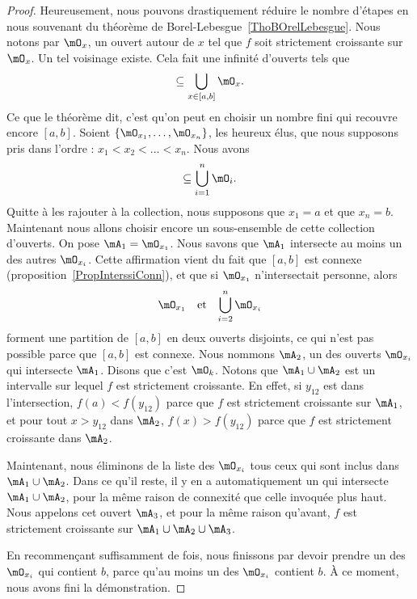 \begin{proof}
    Heureusement, nous pouvons drastiquement réduire le nombre d'étapes en nous souvenant du théorème de Borel-Lebesgue~\ref{ThoBOrelLebesgue}. Nous notons par $\mO_x$, un ouvert autour de $x$ tel que $f$ soit strictement croissante sur $\mO_x$. Un tel voisinage existe. Cela fait une infinité d'ouverts tels que
    \begin{equation}
        [a,b]\subseteq\bigcup_{x\in[a,b]}\mO_x.
    \end{equation}
    Ce que le théorème dit, c'est qu'on peut en choisir un nombre fini qui recouvre encore $[a,b]$. Soient $\{ \mO_{x_1},\ldots,\mO_{x_n} \}$, les heureux élus, que nous supposons pris dans l'ordre : $x_1<x_2<\ldots<x_n$. Nous avons
    \begin{equation}
        [a,b]\subseteq\bigcup_{i=1}^n\mO_i.
    \end{equation}
    Quitte à les rajouter à la collection, nous supposons que $x_1=a$ et que $x_n=b$. Maintenant nous allons choisir encore un sous-ensemble de cette collection d'ouverts. On pose $\mA_1=\mO_{x_1}$. Nous savons que $\mA_1$ intersecte au moins un des autres $\mO_{x_i}$. Cette affirmation vient du fait que $[a,b]$ est connexe (proposition~\ref{PropInterssiConn}), et que si $\mO_{x_1}$ n'intersectait personne, alors
    \begin{equation}
        \begin{aligned}[]
            \mO_{x_1}&&\text{et}&&\bigcup_{i=2}^n\mO_{x_i}
        \end{aligned}
    \end{equation}
    forment une partition de $[a,b]$ en deux ouverts disjoints, ce qui n'est pas possible parce que $[a,b]$ est connexe. Nous nommons $\mA_2$, un des ouverts $\mO_{x_i}$ qui intersecte $\mA_1$. Disons que c'est $\mO_k$. Notons que $\mA_1\cup\mA_2$ est un intervalle sur lequel $f$ est strictement croissante. En effet, si $y_{12}$ est dans l'intersection, $f(a)<f(y_{12})$ parce que $f$ est strictement croissante sur $\mA_1$, et pour tout $x>y_{12}$ dans $\mA_2$, $f(x)>f(y_{12})$ parce que $f$ est strictement croissante dans $\mA_2$.

    Maintenant, nous éliminons de la liste des $\mO_{x_i}$ tous ceux qui sont inclus dans $\mA_1\cup\mA_2$. Dans ce qu'il reste, il y en a automatiquement un qui intersecte $\mA_1\cup\mA_2$, pour la même raison de connexité que celle invoquée plus haut. Nous appelons cet ouvert $\mA_3$, et pour la même raison qu'avant, $f$ est strictement croissante sur $\mA_1\cup\mA_2\cup\mA_3$.

    En recommençant suffisamment de fois, nous finissons par devoir prendre un des $\mO_{x_i}$ qui contient $b$, parce qu'au moins un des $\mO_{x_i}$ contient $b$. À ce moment, nous avons fini la démonstration.
\end{proof}

